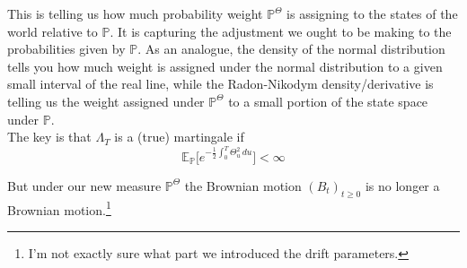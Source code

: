 \documentclass[12pt]{article}
\newlength\tindent
\renewcommand{\indent}{\hspace*{\tindent}}
\begin{document}
\indent This is telling us how much probability weight $\mathbb P^\Theta$ is assigning to the states of the world relative to $\mathbb P$. It is capturing the adjustment we ought to be making to the probabilities given by $\mathbb P$. As an analogue, the density of the normal distribution tells you how much weight is assigned under the normal distribution to a given small interval of the real line, while the Radon-Nikodym density/derivative is telling us the weight assigned under $\mathbb P^\Theta$ to a small portion of the state space under $\mathbb P$. \\

The key is that $\Lambda_T$ is a (true) martingale if
\begin{equation*}
	\mathbb E_{\mathbb P}\Big[e^{-\frac{1}{2}\int^T_0\Theta_u^2\,du}\Big] < \infty
\end{equation*}

But under our new measure $\mathbb P^\Theta$ the Brownian motion $(B_t)_{t\geq0}$ is no longer a Brownian motion.\footnote{I'm not exactly sure what part we introduced the drift parameters.}
\end{document}
